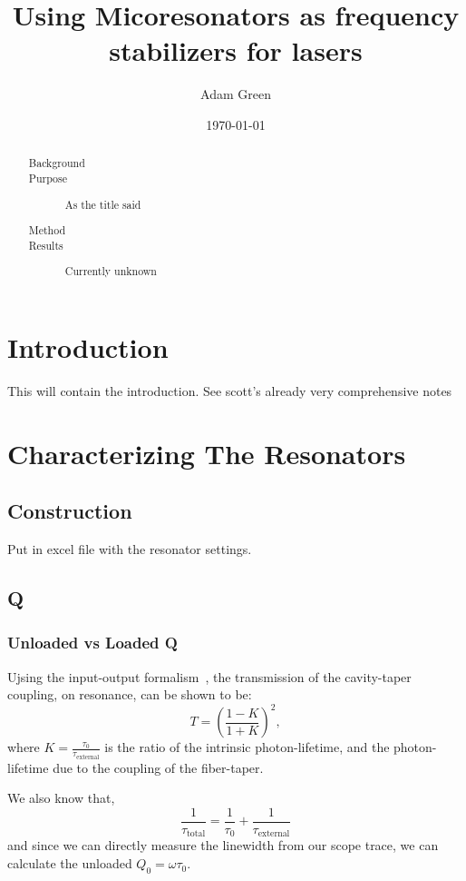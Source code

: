 \documentclass[reprint]{revtex4-1}
\begin{document}
\title{Using Micoresonators as frequency stabilizers for lasers}
\date{\today}
\author{Adam Green}

\begin{abstract}
\begin{description}
\item[Background]
\item[Purpose] As the title said
\item[Method]
\item[Results] Currently unknown
\end{description}
\end{abstract}

\maketitle

\section*{\label{sec:intro}Introduction}
This will contain the introduction. See scott's already very comprehensive notes

\section*{Characterizing The Resonators}
\subsection*{Construction}
Put in excel file with the resonator settings.
\subsection*{Q}
\subsubsection*{Unloaded vs Loaded Q}
Ujsing the input-output formalism~\cite{thesis:schliesser}, the transmission
of the cavity-taper coupling, on resonance, can be shown to be:
\[
T = \left( \frac{1-K}{1+K}\right)^2
,
\]
where $K=\frac{\tau_0}{\tau_{\mathrm{external}}}$ is the ratio of the 
intrinsic photon-lifetime, and the photon-lifetime due to the coupling
of the fiber-taper.

We also know that,
\[
\frac{1}{\tau_\mathrm{total}} = \frac{1}{\tau_\mathrm{0}}+\frac{1}{\tau_\mathrm{external}}
\]
and since we can directly measure the linewidth from our scope trace, we can calculate the unloaded $Q_0 = \omega \tau_0$.
\end{document}
